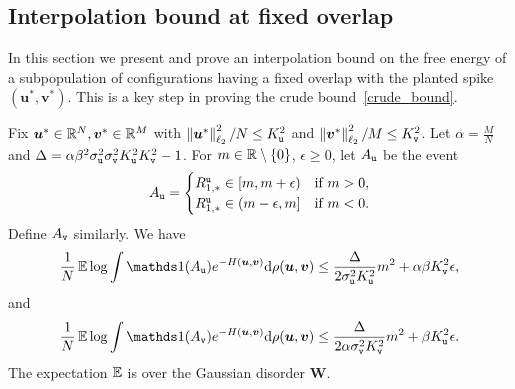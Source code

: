 \documentclass[final,12pt]{colt2018} %
\newcommand{\utt}{\textup{\texttt{u}}}
\newcommand{\vtt}{\textup{\texttt{v}}}
\renewcommand{\u}{\bm{u}}
\renewcommand{\v}{\bm{v}}
\newcommand{\W}{\bm{W}}
\begin{document}
\subsection{Interpolation bound at fixed overlap}
\label{sxn:interpolation_at_fixed_overlap}
In this section we present and prove an interpolation bound on the free energy of a subpopulation of configurations having a fixed overlap with the planted spike $(\u^*,\v^*)$. This is a key step in proving the crude bound~\eqref{crude_bound}. 
\begin{proposition}\label{interpolation_bound_fixed_overlap}
Fix $\u^* \in \R^{N}, \v^* \in \R^{M}$ with $\twonorm{\u^*}^2/N \le K_{\utt}^2$ and $\twonorm{\v^*}^2/M \le K_{\vtt}^2$. Let $\alpha = \frac{M}{N}$ and $\Delta = \alpha \beta^2 \sigma_\utt^2\sigma_\vtt^2K_\utt^2K_\vtt^2-1$. For $m \in \mathbb{R}\setminus \{0\}$, $\epsilon\ge 0$, let $A_{\utt}$ be the event
\begin{align*}
A_{\utt} = 
\begin{cases}
R^{\utt}_{1,*} \in [m,m+\epsilon) & \mbox{if } m >0, \\
R^{\utt}_{1,*} \in (m-\epsilon,m] & \mbox{if } m <0.
\end{cases}
\end{align*}
Define $A_{\vtt}$ similarly. We have 
\begin{equation}\label{interpolation_bound_u}
\frac{1}{N}\E\log \int \indi (A_{\utt}) e^{-H(\u,\v)}\rmd \rho(\u,\v) \le \frac{\Delta}{2\sigma_\utt^2K_\utt^2}  m^2 + \alpha \beta K_{\vtt}^2\epsilon,
\end{equation}
and
\begin{equation}\label{interpolation_bound_v}
\frac{1}{N}\E\log \int \indi(A_{\vtt}) e^{-H(\u,\v)}\rmd \rho(\u,\v) \le \frac{\Delta}{2\alpha \sigma_\vtt^2K_\vtt^2} m^2 + \beta K_{\utt}^2\epsilon.
\end{equation}
The expectation $\operatorname{\mathbb{E}}$ is over the Gaussian disorder $\W$.
\end{proposition}
\end{document}
